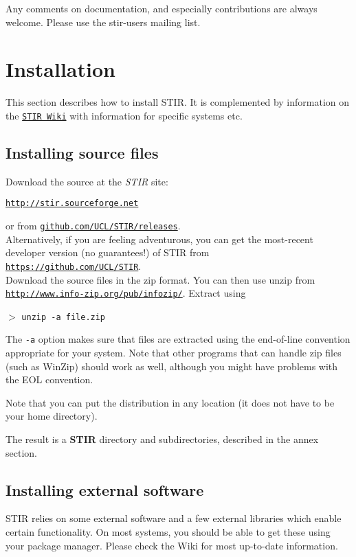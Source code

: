 \documentclass{article}
\def\url#1#2{\mbox{\href{#1}{\tt #2}}}
\newcommand{\cmdline}[1]{\par \noindent $>$ \texttt{#1}\par}
\begin{document}
Any comments on documentation, and especially contributions are 
always welcome. Please use the stir-users mailing list.

\section{
Installation}
This section describes how to install STIR. It is complemented by information on the
\url{http://stir.sourceforge.net/wiki}{STIR Wiki} with information for specific systems etc.

\subsection{
Installing source files}

Download the source at the \textit{STIR} site: 
\begin{center}
\url{http://stir.sourceforge.net }{http://stir.sourceforge.net} 
\end{center}
or from \url{https://github.com/UCL/STIR/releases}{github.com/UCL/STIR/releases}.\\
Alternatively, if you are feeling adventurous, you can get the most-recent
developer version (no guarantees!) of STIR from\\
\url{https://github.com/UCL/STIR}{https://github.com/UCL/STIR}.\\
Download the source files in the zip format. You can then use unzip from \\
\url{http://www.info-zip.org/pub/infozip/}{http://www.info-zip.org/pub/infozip/}. 
Extract using
\cmdline{unzip -a file.zip}


The \texttt{-a} option makes sure that files are extracted using the 
end-of-line convention appropriate for your system. Note that 
other programs that can handle zip files (such as WinZip) should 
work as well, although you might have problems with the EOL convention.


Note that you can put the distribution in any location (it does 
not have to be your home directory).


The result is a \textbf{STIR} directory and subdirectories, described 
in the annex section.

\subsection{
Installing external software}
STIR relies on some external software and a few external libraries which enable certain functionality. 
On most systems, you should be able to get these using your package manager. 
Please check the Wiki for most up-to-date information.
\end{document}
